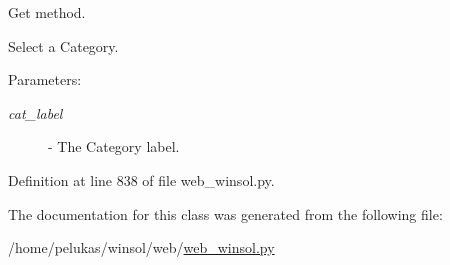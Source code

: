 Get method. 

Select a Category.

\begin{Desc}
\item[Parameters:]
\begin{description}
\item[{\em cat\_\-label}]- The Category label. \end{description}
\end{Desc}


Definition at line 838 of file web\_\-winsol.py.

The documentation for this class was generated from the following file:\begin{CompactItemize}
\item 
/home/pelukas/winsol/web/\hyperlink{web__winsol_8py}{web\_\-winsol.py}\end{CompactItemize}
